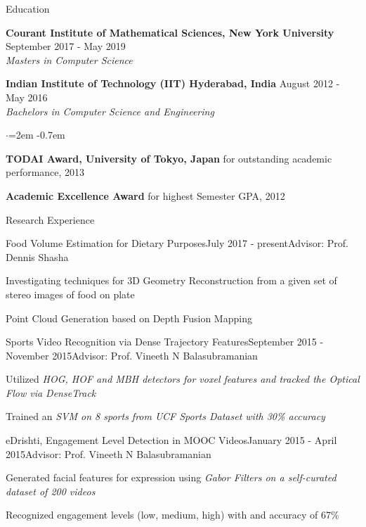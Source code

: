 \documentclass{resume}
\begin{document}
\begin{rSection}{Education}

{\bf Courant Institute of Mathematical Sciences, New York University} \hfill September 2017 - May 2019 \\
\it{Masters in Computer Science}

\vspace{-0.4em}

{\bf Indian Institute of Technology (IIT) Hyderabad, India} \hfill August 2012 - May 2016 \\
\it{Bachelors in Computer Science and Engineering}
\begin{list}{$\cdot$}{\leftmargin=2em}
\itemsep -0.7em \vspace{-0.5em}
\item {\bf TODAI Award, University of Tokyo, Japan} for outstanding academic performance, 2013
\item {\bf Academic Excellence Award} for highest Semester GPA, 2012
\end{list}

\end{rSection}

\begin{rSection}{Research Experience}

\begin{rSubsection}{Food Volume Estimation for Dietary Purposes}{July 2017 - present}{Advisor: Prof. Dennis Shasha}{}
\item Investigating techniques for 3D Geometry Reconstruction from a given set of stereo images of food on plate
\item Point Cloud Generation based on Depth Fusion Mapping

\end{rSubsection}

\begin{rSubsection}{Sports Video Recognition via Dense Trajectory Features}{September 2015 - November 2015}{Advisor:  Prof. Vineeth N Balasubramanian}{}
\item Utilized \it{HOG}, \it{HOF} and \it{MBH} detectors for voxel features and tracked the Optical Flow via \it{DenseTrack}
\item Trained an \it{SVM} on 8 sports from \it{UCF Sports Dataset} with 30\% accuracy

\end{rSubsection}

\begin{rSubsection}{eDrishti, Engagement Level Detection in MOOC Videos}{January 2015 - April 2015}{Advisor:  Prof. Vineeth N Balasubramanian}{}
\item Generated facial features for expression using \it{Gabor Filters} on a self-curated dataset of 200 videos
\item Recognized engagement levels (low, medium, high) with and accuracy of 67\%

\end{rSubsection}

\end{rSection}
\end{document}
